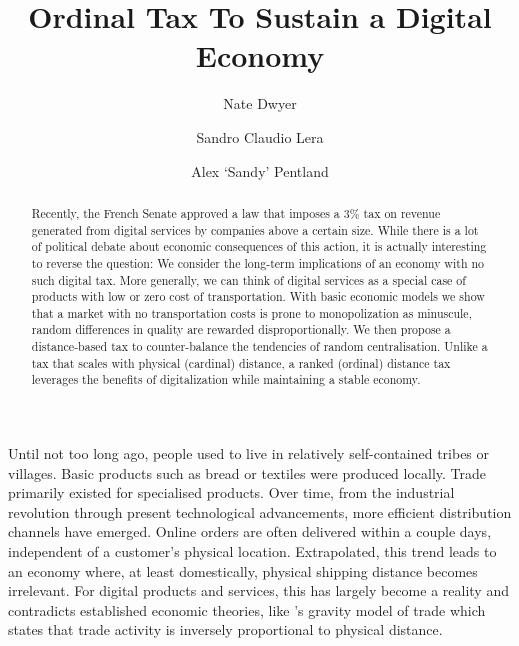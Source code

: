 \documentclass[final,5p,times,twocolumn,11pt,authoryear]{elsarticle}
\numberwithin{equation}{section} %
\begin{document}
\begin{frontmatter}

\title{Ordinal Tax To Sustain a Digital Economy}

\author{Nate Dwyer}

\author{Sandro Claudio Lera}

\author{Alex `Sandy' Pentland}

\address{Massachusetts Institute of Technology, 77 Massachusetts Avenue, 02139 Cambridge, Massachusetts, USA}

\begin{abstract}

Recently, the French Senate approved a law that imposes a $3\%$ tax on revenue generated from digital services by companies above a certain size. 
While there is a lot of political debate about economic consequences of this action, it is actually interesting to reverse the question: 
We consider the long-term implications of an economy with no such digital tax. 
More generally, we can think of digital services as a special case of products with low or zero cost of transportation. 
With basic economic models we show that a market with no transportation costs is prone to monopolization as minuscule, random differences in quality are rewarded disproportionally. 
We then propose a distance-based tax to counter-balance the tendencies of random centralisation.  
Unlike a tax that scales with physical (cardinal) distance, a ranked (ordinal) distance tax leverages the benefits of digitalization while maintaining a stable economy. 

\end{abstract} 

\end{frontmatter}

Until not too long ago, people used to live in relatively self-contained tribes or villages. 
Basic products such as bread or textiles were produced locally. 
Trade primarily existed for specialised products.  
Over time, from the industrial revolution through present technological advancements, more efficient distribution channels have emerged.
Online orders are often delivered within a couple days, independent of a customer’s physical location. 
Extrapolated, this trend leads to an economy where, at least domestically, physical shipping distance becomes irrelevant. 
For digital products and services, this has largely become a reality and contradicts established economic theories, like \cite{Isard1954}'s gravity model of trade which states that trade activity is inversely proportional to physical distance. 
\end{document}
